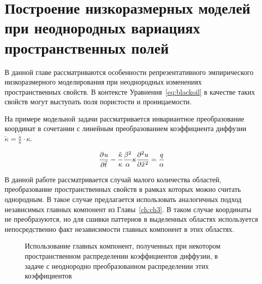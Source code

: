 \chapter{Построение низкоразмерных моделей при неоднородных вариациях пространственных полей}\label{ch:ch4}

В данной главе рассматриваются особенности репрезентативного эмпирического низкоразмерного моделирования при неоднородных изменениях пространственных свойств. В контексте Уравнения~\ref{eq:blackoil} в качестве таких свойств могут выступать поля пористости и проницаемости.

На примере модельной задачи рассматривается инвариантное преобразование координат в сочетании с линейным преобразованием коэффициента диффузии $\check{\kappa} = \frac{\check{\kappa}}{\kappa} \cdot \kappa$.

\begin{align}
    \deriv{u}{\check{t}}
    - \frac{\check{\kappa}}{\kappa}
    \frac{\beta^2}{\alpha}  \kappa \deriv[2]{u}{\check{x}} = \frac{q}{\alpha}
\end{align}

В данной работе рассматривается случай малого количества областей, преобразование пространственных свойств в рамках которых можно считать однородным. В такое случае предлагается использовать аналогичных подход независимых главных компонент из Главы~\ref{ch:ch3}. В таком случае координаты не преобразуются, но для сшивки паттернов в выделенных областях используется непосредственно факт независимости главных компонент в этих областях.

\begin{figure}[ht]
    \caption{Использование главных компонент, полученных при некотором пространственном распределении коэффициентов диффузии, в задаче с неоднородно преобразованном распределении этих коэффициентов~\cite{Elizarev2022}}\label{fig:q-domains}
\end{figure}

